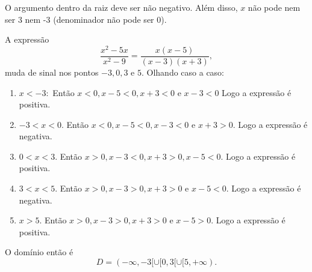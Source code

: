 O argumento dentro da raiz deve ser não negativo.
Além disso, $x$ não pode nem ser 3 nem -3 (denominador não pode ser 0).

A expressão
\[
	\frac{x^2-5x}{x^2-9}=\frac{x(x-5)}{(x-3)(x+3)},
\]
muda de sinal nos pontos $-3,0,3$ e $5$.
Olhando caso a caso:
\begin{enumerate}
	\item $x<-3:$
	Então $x<0,x-5<0, x+3<0$ e $x-3<0$
	Logo a expressão é positiva.

	\item $-3<x<0$.
	Então $x<0,x-5<0,x-3<0$ e $x+3>0$.
	Logo a expressão é negativa.

	\item $0<x<3$.
	Então $x>0,x-3<0,x+3>0,x-5<0$.
	Logo a expressão é positiva.

	\item $3<x<5$.
	Então $x>0,x-3>0,x+3>0$ e $x-5<0$.
	Logo a expressão é negativa.

	\item $x>5$.
	Então $x>0,x-3>0,x+3>0$ e $x-5>0$.
	Logo a expressão é positiva.
\end{enumerate}

O domínio então é
\[
	D=(-\infty,-3[\cup[0,3[\cup[5,+\infty).
\]
